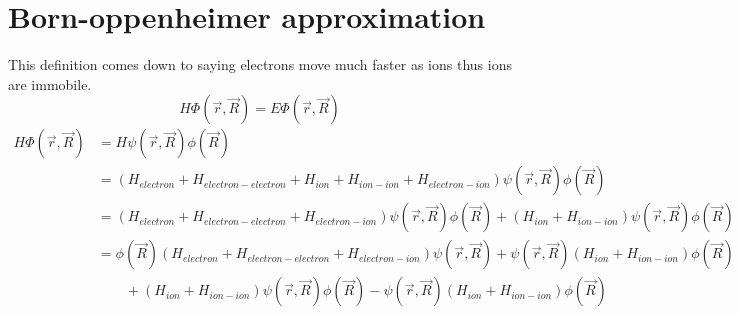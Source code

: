 \documentclass{report}
\begin{document}
\section{Born-oppenheimer approximation}
This definition comes down to saying electrons move much faster as ions thus ions are immobile.
\begin{equation}
	H\Phi(\vec{r}, \vec{R}) = E\Phi(\vec{r}, \vec{R})
\end{equation}
\begin{align}
	H\Phi(\vec{r}, \vec{R}) & = H\psi(\vec{r}, \vec{R})\phi(\vec{R}) \\
	& = (H_{electron} + H_{electron - electron} + H_{ion} + H_{ion - ion} + H_{electron - ion})\psi(\vec{r}, \vec{R})\phi(\vec{R}) \\
	& = (H_{electron} + H_{electron - electron} + H_{electron - ion})\psi(\vec{r}, \vec{R})\phi(\vec{R}) + (H_{ion} + H_{ion - ion})\psi(\vec{r}, \vec{R})\phi(\vec{R}) \\
	& = \phi(\vec{R})(H_{electron} + H_{electron - electron} + H_{electron - ion})\psi(\vec{r}, \vec{R}) + \psi(\vec{r}, \vec{R})(H_{ion} + H_{ion - ion})\phi(\vec{R}) \nonumber \\
	& \qquad + (H_{ion} + H_{ion - ion})\psi(\vec{r}, \vec{R})\phi(\vec{R}) - \psi(\vec{r}, \vec{R})(H_{ion} + H_{ion - ion})\phi(\vec{R})
\end{align}
\end{document}
